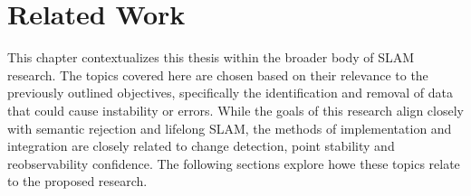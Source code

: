 \section{Related Work}
\label{sec:related_work}

This chapter contextualizes this thesis within the broader body of SLAM research. The topics covered here are chosen based on their relevance to the previously outlined objectives, specifically the identification and removal of data that could cause instability or errors. While the goals of this research align closely with semantic rejection and lifelong SLAM, the methods of implementation and integration are closely related to change detection, point stability and reobservability confidence. The following sections explore howe these topics relate to the proposed research.

% 
